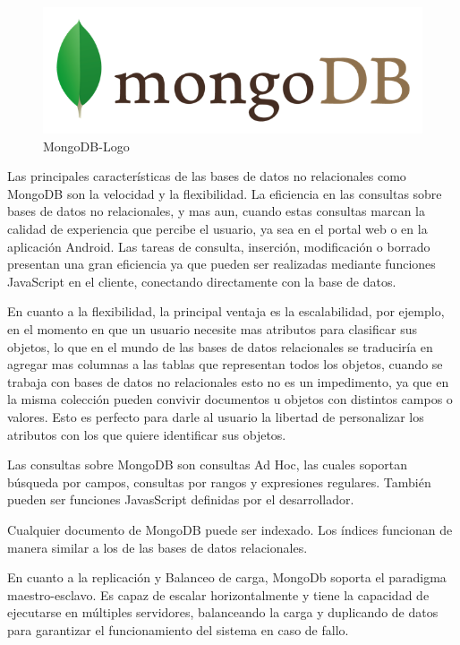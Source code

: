 \documentclass[a4paper,11pt]{book}
\begin{document}
\begin{figure}[H] 
\centering 
\includegraphics[scale=0.45]{imagenes/desarrollo_herramienta/mongo.png}
\caption{ MongoDB-Logo\cite{mongoL}  }  
\end{figure} 

Las principales características de las bases de datos no relacionales como MongoDB son la velocidad y la flexibilidad. La eficiencia en las consultas sobre bases de datos no relacionales, y mas aun, cuando estas consultas marcan la calidad de experiencia que percibe el usuario, ya sea en el portal web o en la aplicación Android.  Las tareas de consulta, inserción, modificación o borrado presentan una gran eficiencia ya que pueden ser realizadas mediante funciones JavaScript en el cliente, conectando directamente con la base de datos.

En cuanto a la flexibilidad, la principal ventaja es la escalabilidad, por ejemplo, en el momento en que un usuario necesite mas atributos para clasificar sus objetos, lo que en el mundo de las bases de datos relacionales se traduciría en agregar mas columnas a las tablas que representan todos los objetos, cuando se trabaja con bases de datos no relacionales esto no es un impedimento, ya que en la misma colección pueden convivir documentos u objetos con distintos campos o valores. Esto es perfecto para darle al usuario la libertad de personalizar los atributos con los que quiere identificar sus objetos. 

Las consultas sobre MongoDB son consultas Ad Hoc, las cuales soportan búsqueda por campos, consultas por rangos y expresiones regulares. También pueden ser funciones JavasScript definidas por el desarrollador. 

Cualquier documento de MongoDB puede ser indexado. Los índices funcionan de manera similar a los de las bases de datos relacionales. 

En cuanto a la replicación y Balanceo de carga, MongoDb soporta el paradigma maestro-esclavo. Es capaz de escalar horizontalmente y tiene la capacidad de ejecutarse en múltiples servidores, balanceando la carga y duplicando de datos para garantizar el funcionamiento del sistema en caso de fallo. 
\end{document}
